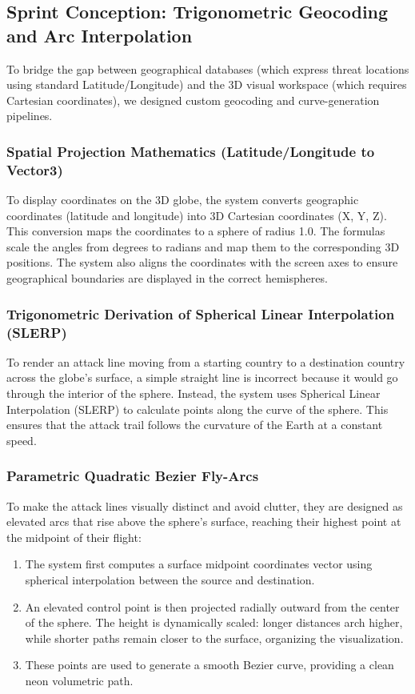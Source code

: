 \subsection{Sprint Conception: Trigonometric Geocoding and Arc Interpolation}
To bridge the gap between geographical databases (which express threat locations using standard Latitude/Longitude) and the 3D visual workspace (which requires Cartesian coordinates), we designed custom geocoding and curve-generation pipelines.

\subsubsection{Spatial Projection Mathematics (Latitude/Longitude to Vector3)}
To display coordinates on the 3D globe, the system converts geographic coordinates (latitude and longitude) into 3D Cartesian coordinates (X, Y, Z). This conversion maps the coordinates to a sphere of radius 1.0. The formulas scale the angles from degrees to radians and map them to the corresponding 3D positions. The system also aligns the coordinates with the screen axes to ensure geographical boundaries are displayed in the correct hemispheres.

\subsubsection{Trigonometric Derivation of Spherical Linear Interpolation (SLERP)}
To render an attack line moving from a starting country to a destination country across the globe's surface, a simple straight line is incorrect because it would go through the interior of the sphere. Instead, the system uses Spherical Linear Interpolation (SLERP) to calculate points along the curve of the sphere. This ensures that the attack trail follows the curvature of the Earth at a constant speed.

\subsubsection{Parametric Quadratic Bezier Fly-Arcs}
To make the attack lines visually distinct and avoid clutter, they are designed as elevated arcs that rise above the sphere's surface, reaching their highest point at the midpoint of their flight:
\begin{enumerate}
    \item The system first computes a surface midpoint coordinates vector using spherical interpolation between the source and destination.
    \item An elevated control point is then projected radially outward from the center of the sphere. The height is dynamically scaled: longer distances arch higher, while shorter paths remain closer to the surface, organizing the visualization.
    \item These points are used to generate a smooth Bezier curve, providing a clean neon volumetric path.
\end{enumerate}

